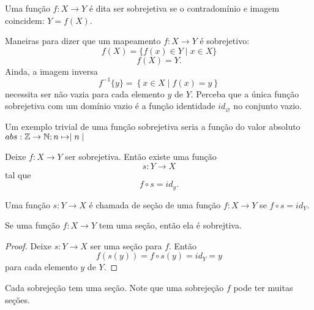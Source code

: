 \begin{definition}
	Uma função $f: X \to Y$ é dita ser sobrejetiva se o contradomínio e imagem coincidem: $Y = f(X)$.
\end{definition}
Maneiras para dizer que um mapeamento $f: X \to Y$ é sobrejetivo:
$$f(X) = \{f(x) \in Y \mid x \in X\}$$
$$f(X) = Y.$$
Ainda, a imagem inversa $$f^{-1}\{y\} = \left\{x \in X \mid f(x) = y\right\}$$
necessita ser não vazia para cada elemento $y$ de $Y$. Perceba que a única função sobrejetiva com um domínio vazio é a função identidade $id_{\varnothing}$ no conjunto vazio.

Um exemplo trivial de uma função sobrejetiva seria a função do valor absoluto $abs: \mathbb{Z} \to \mathbb{N}; n \mapsto \mid n \mid$
\begin{stat}
  Deixe $f: X \to Y$ ser sobrejetiva. Então existe uma função $$s: Y \to X$$ tal que $$f \circ s = id_{y}.$$
\end{stat}
\begin{definition}[Seções]
  Uma função $s: Y \to X$ é chamada de seção de uma função $f: X \to Y$ se $f \circ s = id_{Y}.$
\end{definition}
\begin{stat}
  Se uma função $f: X \to Y$ tem uma seção, então ela é sobrejtiva.
  \begin{proof}
    Deixe $s: Y\to X$ ser uma seção para $f$. Então $$f\left(s(y)\right) = f\circ s(y) = id_{Y} = y$$
    para cada elemento $y$ de $Y$.
  \end{proof}
\end{stat}
Cada sobrejeção tem uma seção. Note que uma sobrejeção $f$ pode ter muitas seções.

